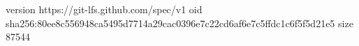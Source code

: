 version https://git-lfs.github.com/spec/v1
oid sha256:80ee8c556948ca5495d7714a29cac0396e7c22cd6af6e7c5ffdc1c6f5f5d21e5
size 87544
